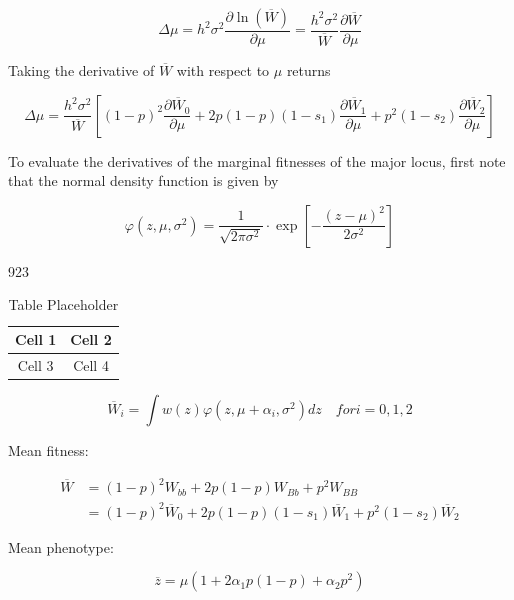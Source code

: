 \documentclass{article}
\begin{document}
\begin{equation}
\Delta\mu=h^{2}\sigma^{2}\frac{\partial\ln(\overline{W})}{\partial\mu}=\frac{h^{2}\sigma^{2}}{\overline{W}}\frac{\partial\overline{W}}{\partial\mu}
\tag{25.7a}
\label{eq:25_7a}
\end{equation}

Taking the derivative of  $ \overline{W} $ with respect to  $ \mu $ returns

\begin{equation}
\Delta\mu=\frac{h^{2}\sigma^{2}}{\overline{W}}\left[(1-p)^{2}\frac{\partial\overline{W}_{0}}{\partial\mu}+2p(1-p)(1-s_{1})\frac{\partial\overline{W}_{1}}{\partial\mu}+p^{2}(1-s_{2})\frac{\partial\overline{W}_{2}}{\partial\mu}\right]
\tag{25.7b}
\label{eq:25_7b}
\end{equation}

To evaluate the derivatives of the marginal fitnesses of the major locus, first note that the normal density function is given by

\begin{equation}
\varphi(z,\mu,\sigma^{2})=\frac{1}{\sqrt{2\pi\sigma^{2}}}\cdot\exp\left[-\frac{(z-\mu)^{2}}{2\sigma^{2}}\right]
\end{equation}

923

\begin{table}[h]
\centering
\begin{tabular}{|c|c|}
\hline
Cell 1 & Cell 2 \\
\hline
Cell 3 & Cell 4 \\
\hline
\end{tabular}
\caption{Table Placeholder}
\end{table}

\begin{equation}
\overline{W}_{i}=\int w(z)\varphi(z,\mu+\alpha_{i},\sigma^{2})d z\quad for i=0,1,2
\end{equation}

Mean fitness:

\begin{equation}
\begin{aligned}\overline{W}&=(1-p)^{2}W_{bb}+2p(1-p)W_{Bb}+p^{2}W_{BB}\\&=(1-p)^{2}\overline{W}_{0}+2p(1-p)(1-s_{1})\overline{W}_{1}+p^{2}(1-s_{2})\overline{W}_{2}\end{aligned}
\end{equation}

Mean phenotype:

\begin{equation}
\overline{z}=\mu\left(1+2\alpha_{1}p(1-p)+\alpha_{2}p^{2}\right)
\end{equation}
\end{document}
